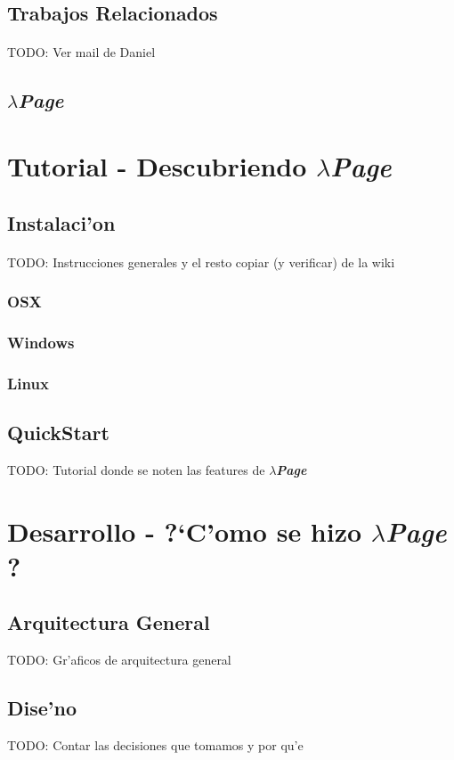 \documentclass[a4paper]{article}
\newcommand{\hpage}{\textbf{\textsl{$\lambda$Page}} }
\begin{document}
\subsection{Trabajos Relacionados}
\paragraph{}TODO: Ver mail de Daniel
\subsection{\hpage}
\newpage

\section{Tutorial - Descubriendo \hpage}
\subsection{Instalaci'on}
\paragraph{}TODO: Instrucciones generales y el resto copiar (y verificar) de la wiki
\subsubsection{OSX}
\subsubsection{Windows}
\subsubsection{Linux}
\subsection{QuickStart}TODO: Tutorial donde se noten las features de \hpage
\newpage

\section{Desarrollo - ?`C'omo se hizo \hpage?}
\subsection{Arquitectura General} TODO: Gr'aficos de arquitectura general
\subsection{Dise'no} TODO: Contar las decisiones que tomamos y por qu'e
\end{document}
